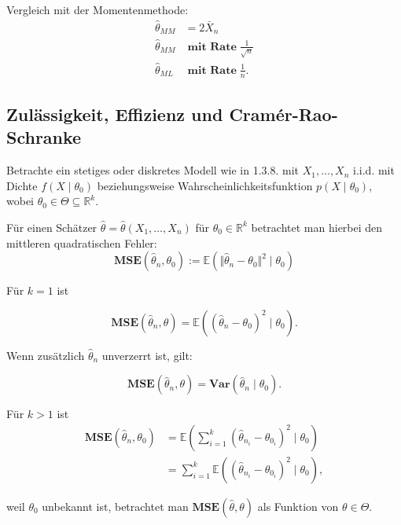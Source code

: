 \documentclass[10pt]{article}
\newcommand{\FZV}{X_1, \ldots, X_n} %
\newcommand{\IR}{\mathbb{R}} %
\newcommand{\EW}{\mathbb{E}} %
\newcommand{\MSE}{\textbf{MSE}} %
\newenvironment{BSP}[1][]
{\begin{Beispiel}[frametitle=#1]}{\end{Beispiel}}
\begin{document}
\begin{BSP}[Beispiel 1.3.11 (Grenzverteilung keine Normalverteilung)]
		Vergleich mit der Momentenmethode:
		\begin{equation*}
			\begin{split}
				\hat{\theta}_{MM}& = 2 \bar{X}_n\\
				\hat{\theta}_{MM}& \; \textbf{mit Rate} \;\frac{1}{\sqrt{n}}\\
				\hat{\theta}_{ML}& \; \textbf{mit Rate} \;\frac{1}{n}.
			\end{split}
		\end{equation*}
	\end{BSP}
	
	\subsection{Zulässigkeit, Effizienz und Cramér-Rao-Schranke}
	
	Betrachte ein stetiges oder diskretes Modell wie in 1.3.8. mit $\FZV$ i.i.d. mit Dichte $f(X\mid \theta_0)$ beziehungsweise Wahrscheinlichkeitsfunktion $p(X \mid \theta_0)$, wobei $\theta_0 \in \Theta \subseteq \IR^k$. 
	
	Für einen Schätzer $\hat{\theta} = \hat{\theta}(X_1, \ldots, X_n)$ für $\theta_0 \in \IR^k$ betrachtet man hierbei den mittleren quadratischen Fehler:
	\begin{equation*}
		\textbf{MSE}(\hat{\theta}_n, \theta_0) := \EW (\Vert {\hat{\theta}_n-\theta_0}\Vert ^2 \mid \theta_0)
	\end{equation*}
	
	\begin{Bemerkung}[Bemerkung ]
		 Für $k = 1$ ist 
		
		\begin{equation*}
			\textbf{MSE} (\hat{\theta}_n, \theta) = \EW (( {\hat{\theta}_n-\theta_0} )^2 \mid \theta_0).
		\end{equation*}
		
		Wenn zusätzlich 	$\hat{\theta}_n$ unverzerrt ist, gilt: 
		
		\begin{equation*}
			\textbf{MSE} (\hat{\theta}_n, \theta) =  \textbf{Var}(\hat{\theta}_n \mid \theta_0).
		\end{equation*}
		
		Für $k>1$ ist 
		\begin{equation*}
			\begin{split}
				\MSE(\hat{\theta}_n, \theta_0) &= \EW(\sum_{i=1}^{k}(\hat{\theta}_{n_{i}} - \theta_{0_{i}})^2 \mid \theta_0 )\\
				&= \sum_{i=1}^{k} \EW ((\hat{\theta}_{n_{i}} - \theta_{0_{i}})^2 \mid \theta_0),
			\end{split}
		\end{equation*}
		
		weil $\theta_0$ unbekannt ist, betrachtet man $\MSE(\hat{\theta}, \theta)$ als Funktion von $\theta \in \Theta$.
	\end{Bemerkung}
	
\end{document}
